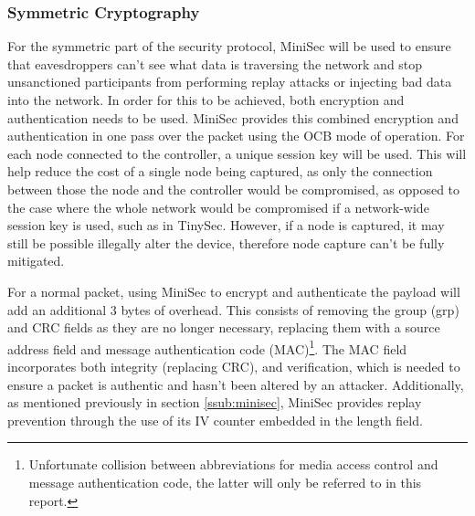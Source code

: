 \documentclass{mprop}
\begin{document}
\subsubsection{Symmetric Cryptography} %
\label{ssub:symmetric_key_cryptography}
For the symmetric part of the security protocol, MiniSec\cite{MiniSec} will be used to ensure that eavesdroppers can't see what data is traversing the network and stop unsanctioned participants from performing replay attacks or injecting bad data into the network. In order for this to be achieved, both encryption and authentication needs to be used. MiniSec provides this combined encryption and authentication in one pass over the packet using the OCB mode of operation. For each node connected to the controller, a unique session key will be used. This will help reduce the cost of a single node being captured, as only the connection between those the node and the controller would be compromised, as opposed to the case where the whole network would be compromised if a network-wide session key is used, such as in TinySec\cite{TinySec}. However, if a node is captured, it may still be possible illegally alter the device, therefore node capture can't be fully mitigated.

For a normal packet, using MiniSec to encrypt and authenticate the payload will add an additional 3 bytes of overhead. This consists of removing the group (grp) and CRC fields as they are no longer necessary, replacing them with a source address field and message authentication code (MAC)\footnote{Unfortunate collision between abbreviations for media access control and message authentication code, the latter will only be referred to in this report.}. The MAC field incorporates both integrity (replacing CRC), and verification, which is needed to ensure a packet is authentic and hasn't been altered by an attacker. Additionally, as mentioned previously in section \ref{ssub:minisec}, MiniSec provides replay prevention through the use of its IV counter embedded in the length field.


\end{document}
